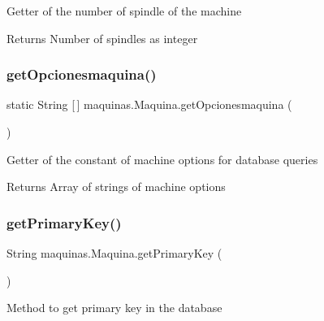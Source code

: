 Getter of the number of spindle of the machine

\begin{DoxyReturn}{Returns}
Number of spindles as integer 
\end{DoxyReturn}
\mbox{\label{classmaquinas_1_1_maquina_af991a3b43334a33919d562d5a76e1d38}} 
\subsubsection{\texorpdfstring{get\+Opcionesmaquina()}{getOpcionesmaquina()}}
{\footnotesize\ttfamily static String \mbox{[}$\,$\mbox{]} maquinas.\+Maquina.\+get\+Opcionesmaquina (\begin{DoxyParamCaption}{ }\end{DoxyParamCaption})\hspace{0.3cm}{\ttfamily [static]}}

Getter of the constant of machine options for database queries

\begin{DoxyReturn}{Returns}
Array of strings of machine options 
\end{DoxyReturn}
\mbox{\label{classmaquinas_1_1_maquina_a96e2d5af0f84acd39c23cc43d513f3ee}} 
\subsubsection{\texorpdfstring{get\+Primary\+Key()}{getPrimaryKey()}}
{\footnotesize\ttfamily String maquinas.\+Maquina.\+get\+Primary\+Key (\begin{DoxyParamCaption}{ }\end{DoxyParamCaption})}

Method to get primary key in the database

